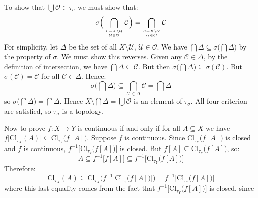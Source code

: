 \documentclass{article}
\theoremstyle{normal}
\begin{document}
    To show that $\bigcup\mathcal{O}\in\tau_{\sigma}$ we must show that:
    \begin{equation}
        \sigma\Big(
        \bigcap_{{\mathcal{C}=X\setminus\mathcal{U}}\atop{\mathcal{U}\in\mathcal{O}}}\mathcal{C}
        \Big)
        =\bigcap_{{\mathcal{C}=X\setminus\mathcal{U}}\atop{\mathcal{U}\in\mathcal{O}}}\mathcal{C}
    \end{equation}
    For simplicity, let $\Delta$ be the set of all $X\setminus\mathcal{U}$,
    $\mathcal{U}\in\mathcal{O}$. We have
    $\bigcap\Delta\subseteq\sigma\big(\bigcap\Delta)$ by the property of
    $\sigma$. We must show this reverses. Given any $\mathcal{C}\in\Delta$,
    by the definition of intersection, we have
    $\bigcap\Delta\subseteq\mathcal{C}$. But then
    $\sigma\big(\bigcap\Delta\big)\subseteq\sigma(\mathcal{C})$. But
    $\sigma(\mathcal{C})=\mathcal{C}$ for all $\mathcal{C}\in\Delta$. Hence:
    \begin{equation}
        \sigma\Big(\bigcap\Delta\Big)
        \subseteq\bigcap_{\mathcal{C}\in\Delta}\mathcal{C}
        =\bigcap\Delta
    \end{equation}
    so $\sigma\big(\bigcap\Delta\big)=\bigcap\Delta$. Hence
    $X\setminus\bigcap\Delta=\bigcup\mathcal{O}$ is an element of
    $\tau_{\sigma}$. All four criterion are satisfied, so $\tau_{\sigma}$ is
    a topology.
    \par\hfill\par
    Now to prove $f:X\rightarrow{Y}$ is continuous if and only if
    for all $A\subseteq{X}$ we have
    $f\big[\textrm{Cl}_{\tau_{X}}(A)\big]\subseteq\textrm{Cl}_{\tau_{Y}}\big(f[A]\big)$.
    Suppose $f$ is continuous. Since
    $\textrm{Cl}_{\tau_{Y}}\big(f[A]\big)$ is closed and $f$ is continuous,
    $f^{-1}\Big[\textrm{Cl}_{\tau_{Y}}\big(f[A]\big)\Big]$ is closed. But
    $f[A]\subseteq\textrm{Cl}_{\tau_{Y}}\big(f[A]\big)$, so:
    \begin{equation}
        A\subseteq{f}^{-1}\big[f[A]\big]
        \subseteq{f}^{-1}\Big[\textrm{Cl}_{\tau_{Y}}\big(f[A]\big)\Big]
    \end{equation}
    Therefore:
    \begin{equation}
        \textrm{Cl}_{\tau_{X}}(A)
        \subseteq\textrm{Cl}_{\tau_{X}}\bigg(
            f^{-1}\Big[\textrm{Cl}_{\tau_{Y}}\big(f[A]\big)\Big]
        \bigg)
        =f^{-1}\Big[\textrm{Cl}_{\tau_{Y}}\big(f[A]\big)\Big]
    \end{equation}
    where this last equality comes from the fact that
    $f^{-1}\Big[\textrm{Cl}_{\tau_{Y}}\big(f[A]\big)\Big]$ is closed, since
\end{document}
